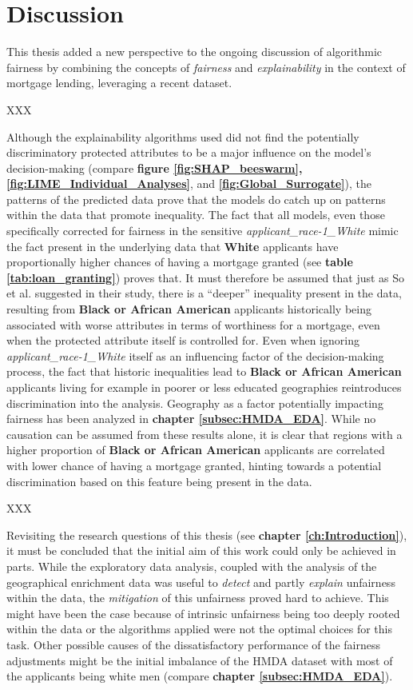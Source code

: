 \chapter{Discussion}\label{ch:discussion}

This thesis added a new perspective to the ongoing discussion of algorithmic fairness by combining the concepts of \textit{fairness} and \textit{explainability} in the context of mortgage lending, leveraging a recent dataset.

XXX

Although the explainability algorithms used did not find the potentially discriminatory protected attributes to be a major influence on the model’s decision-making (compare \textbf{figure \ref{fig:SHAP_beeswarm}, \ref{fig:LIME_Individual_Analyses}}, and \textbf{\ref{fig:Global_Surrogate}}), the patterns of the predicted data prove that the models do catch up on patterns within the data that promote inequality. 
The fact that all models, even those specifically corrected for fairness in the sensitive \textit{applicant\_race-1\_White} mimic the fact present in the underlying data that \textbf{White} applicants have proportionally higher chances of having a mortgage granted (see \textbf{table \ref{tab:loan_granting}}) proves that. 
It must therefore be assumed that just as So et al. \parencite{So2022} suggested in their study, there is a “deeper” inequality present in the data, resulting from \textbf{Black or African American} applicants historically being associated with worse attributes in terms of worthiness for a mortgage, even when the protected attribute itself is controlled for.
Even when ignoring \textit{applicant\_race-1\_White} itself as an influencing factor of the decision-making process, the fact that historic inequalities lead to \textbf{Black or African American} applicants living for example in poorer or less educated geographies reintroduces discrimination into the analysis.
Geography as a factor potentially impacting fairness has been analyzed in \textbf{chapter \ref{subsec:HMDA_EDA}}. While no causation can be assumed from these results alone, it is clear that regions with a higher proportion of \textbf{Black or African American} applicants are correlated with lower chance of having a mortgage granted, hinting towards a potential discrimination based on this feature being present in the data.

XXX

Revisiting the research questions of this thesis (see \textbf{chapter \ref{ch:Introduction}}), it must be concluded that the initial aim of this work could only be achieved in parts. 
While the exploratory data analysis, coupled with the analysis of the geographical enrichment data was useful to \textit{detect} and partly \textit{explain} unfairness within the data, the \textit{mitigation} of this unfairness proved hard to achieve. 
This might have been the case because of intrinsic unfairness being too deeply rooted within the data or the algorithms applied were not the optimal choices for this task.
Other possible causes of the dissatisfactory performance of the fairness adjustments might be the initial imbalance of the HMDA dataset with most of the applicants being white men (compare \textbf{chapter \ref{subsec:HMDA_EDA}}).

